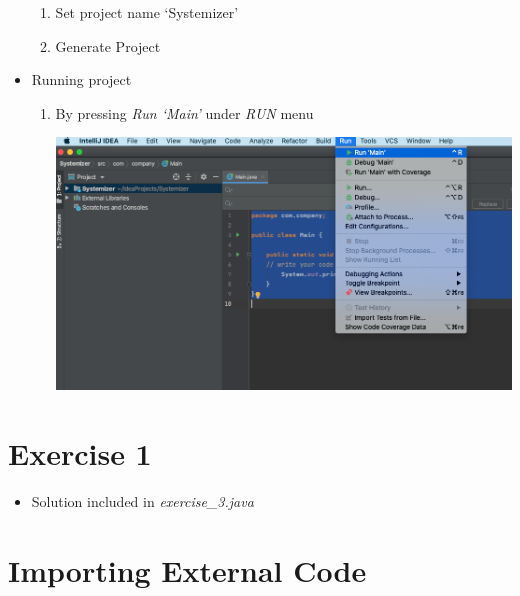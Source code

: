 \documentclass[12pt]{article}
\begin{document}
\begin{itemize}
\begin{enumerate}[1.]
        \item Set project name `Systemizer'

        \item Generate Project
    \end{enumerate}

    \item Running project

    \begin{enumerate}[1.]
        \item By pressing \textit{Run `Main'} under \textit{RUN} menu

        \begin{center}
        \includegraphics[width=\linewidth]{images/part_2_notes_4.png}
        \end{center}
    \end{enumerate}

\end{itemize}

\bigskip

\section{Exercise 1}

\bigskip

\begin{itemize}
    \item Solution included in \textit{exercise\_3.java}
\end{itemize}

\bigskip

\section{Importing External Code}

\bigskip
\end{document}
